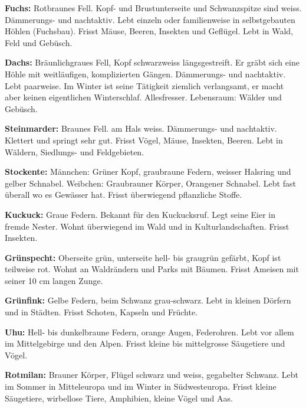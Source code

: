 \textbf{Fuchs: }Rotbraunes Fell. Kopf- und Brustunterseite und Schwanzspitze sind weiss. Dämmerungs- und nachtaktiv. Lebt einzeln oder familienweise in selbstgebauten Höhlen (Fuchsbau). Frisst Mäuse, Beeren, Insekten und Geflügel. Lebt in Wald, Feld und Gebüsch. \par

\textbf{Dachs: }Bräunlichgraues Fell, Kopf schwarzweiss längsgestreift. Er gräbt sich eine Höhle mit weitläufigen, komplizierten Gängen. Dämmerungs- und nachtaktiv. Lebt paarweise. Im Winter ist seine Tätigkeit ziemlich verlangsamt, er macht aber keinen eigentlichen Winterschlaf. Allesfresser. Lebensraum: Wälder und Gebüsch.\par

\textbf{Steinmarder: }Braunes Fell. am Hals weiss. Dämmerungs- und nachtaktiv. Klettert und springt sehr gut. Frisst Vögel, Mäuse, Insekten, Beeren. Lebt in Wäldern, Siedlungs- und Feldgebieten.\par

\textbf{Stockente: }Männchen: Grüner Kopf, graubraune Federn, weisser Halsring und gelber Schnabel. Weibchen: Graubrauner Körper, Orangener Schnabel. Lebt fast überall wo es Gewässer hat. Frisst überwiegend pflanzliche Stoffe.\par

\textbf{Kuckuck: }Graue Federn. Bekannt für den Kuckucksruf. Legt seine Eier in fremde Nester. Wohnt überwiegend im Wald und in Kulturlandschaften. Frisst Insekten.\par

\textbf{Grünspecht: }Oberseite grün, unterseite hell- bis graugrün gefärbt, Kopf ist teilweise rot. Wohnt an Waldrändern und Parks mit Bäumen. Frisst Ameisen mit seiner 10 cm langen Zunge.\par

\textbf{Grünfink: }Gelbe Federn, beim Schwanz grau-schwarz. Lebt in kleinen Dörfern und in Städten. Frisst Schoten, Kapseln und Früchte.\par

\textbf{Uhu: }Hell- bis dunkelbraune Federn, orange Augen, Federohren. Lebt vor allem im Mittelgebirge und den Alpen. Frisst kleine bis mittelgrosse Säugetiere und Vögel.\par

\textbf{Rotmilan: }Brauner Körper, Flügel schwarz und weiss, gegabelter Schwanz. Lebt im Sommer in Mitteleuropa und im Winter in Südwesteuropa. Frisst kleine Säugetiere, wirbellose Tiere, Amphibien, kleine Vögel und Aas. \par

